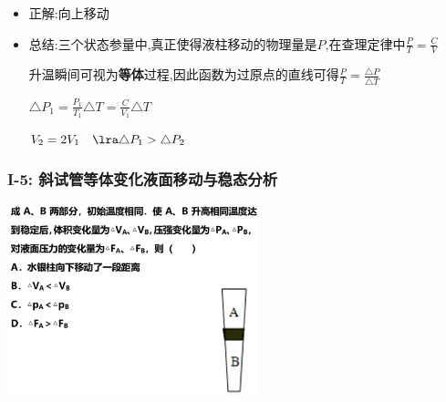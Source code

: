 \documentclass{article}
\begin{document}
\begin{itemize}
    \item 正解:\quad 向上移动
    \item 总结:\quad 三个状态参量中,真正使得液柱移动的物理量是$P$,在查理定律中$\frac{P}{T} = \frac{C}{V}$

          \hspace{3.3em}升温瞬间可视为\textbf{等体}过程,因此函数为过原点的直线可得$\frac{P}{T} = \frac{\triangle P}{\triangle T}$

          \hspace{3.3em}$ \triangle P_{1} = \frac{P_{1}}{T_{1}} \triangle T = \frac{C}{V_{1}} \triangle T $

          \hspace{3.3em}$ V_{2} = 2 V_{1}  \quad \lra \triangle P_{1} > \triangle P_{2}$
\end{itemize}

\vspace{2em}

\subsubsection{I-5: 斜试管等体变化液面移动与稳态分析}
\includegraphics[width = 0.55\textwidth,keepaspectratio]{./pictures/2.3-6.png}
\end{document}
